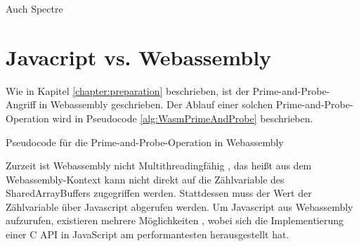 

Auch Spectre



\section{Javacript vs. Webassembly}

Wie in Kapitel \ref{chapter:preparation} beschrieben, ist der Prime-and-Probe-Angriff in Webassembly geschrieben.
Der Ablauf einer solchen Prime-and-Probe-Operation wird in Pseudocode \ref{alg:WasmPrimeAndProbe} beschrieben.

\begin{algorithm}[h]
\DontPrintSemicolon
\caption{Pseudocode für die Prime-and-Probe-Operation in Webassembly}
\label{alg:WasmPrimeAndProbe}

\end{algorithm}

Zurzeit ist Webassembly nicht Multithreadingfähig \cite{WebassemblyThreads}, das heißt aus dem Webassembly-Kontext kann nicht direkt auf die Zählvariable des SharedArrayBuffers zugegriffen werden.
Stattdessen muss der Wert der Zählvariable über Javascript abgerufen werden.
Um Javascript aus Webassembly aufzurufen, existieren mehrere Möglichkeiten \cite{CallJavaScriptFromWasm}, wobei sich die Implementierung einer C API in JavaScript am performantesten herausgestellt hat.

